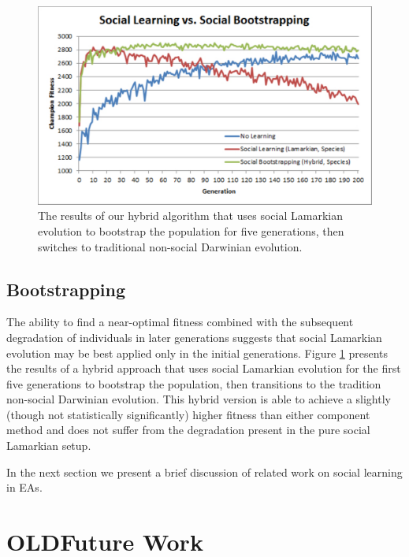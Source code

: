 \documentclass{acm_proc_article-sp}
\begin{document}
\begin{figure}
  \centering
    \includegraphics[scale=.35]{learning_bootstrapping.pdf}
  \caption{The results of our hybrid algorithm that uses social Lamarkian evolution to bootstrap the population for five generations, then switches to traditional non-social Darwinian evolution.}
  \label{fig:learning-bootstrapping}
\end{figure}

\subsection*{Bootstrapping}
The ability to find a near-optimal fitness combined with the subsequent degradation of individuals in later generations suggests that social Lamarkian evolution may be best applied only in the initial generations. Figure \ref{fig:learning-bootstrapping} presents the results of a hybrid approach that uses social Lamarkian evolution for the first five generations to bootstrap the population, then transitions to the tradition non-social Darwinian evolution. This hybrid version is able to achieve a slightly (though not statistically significantly) higher fitness than either component method and does not suffer from the degradation present in the pure social Lamarkian setup.

In the next section we present a brief discussion of related work on social learning in EAs.
\section{OLDFuture Work}
\label{sec:future}
\end{document}
